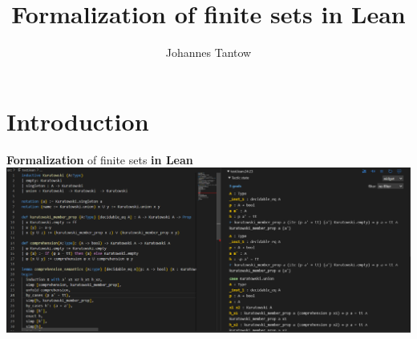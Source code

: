 \documentclass{beamer}
\title[Finite sets]{Formalization of finite sets in Lean}
\author[J. Tantow]{Johannes Tantow}
\begin{document}
    \maketitle

    \section{Introduction}
    \begin{frame}[fragile]{\textbf{Formalization} of finite sets \textbf{in Lean}}
        \includegraphics[width=1\textwidth]{Lean_Preview.png}
    \end{frame}
\end{document}
